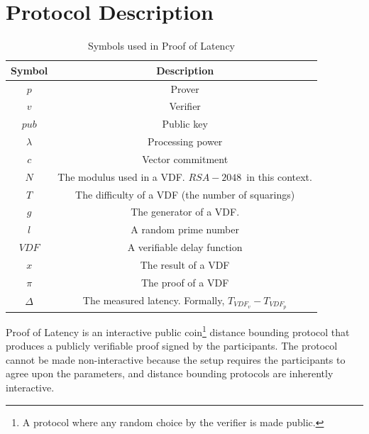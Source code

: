 \section{Protocol Description}
\begin{table}[h!]
	\centering
	\begin{tabular}{ c|c  }
		Symbol        & Description                                             \\
		\hline
		\( p \)       & Prover                                                  \\
		\( v \)       & Verifier                                                \\
		\( pub \)      & Public key                                              \\
		\( \lambda \) & Processing power                                        \\
		\( c \)       & Vector commitment                                       \\
		\( N \)       & The modulus used in a VDF. \(RSA-2048\)~in this context.   \\

		\( T \)       & The difficulty of a VDF (the number of squarings)       \\
		\( g \)       & The generator of a VDF.                                 \\
		\( l \)       & A random prime number                                   \\
		\( VDF \)     & A verifiable delay function                             \\
		\( x \)       & The result of a VDF                                     \\
		\(\pi \)      & The proof of a VDF                                      \\
		\(\Delta\)    & The measured latency. Formally, \(T_{VDF_v} - T_{VDF_p}\) \\
	\end{tabular}
	\caption{Symbols used in Proof of Latency}
	\label{table:1}
\end{table}

Proof of Latency is an interactive public coin\footnote{A protocol where any random choice by the verifier is made public.} distance bounding protocol that produces a publicly verifiable proof signed by the participants. The protocol cannot be made non-interactive because the setup requires the participants to agree upon the parameters, and distance bounding protocols are inherently interactive.

